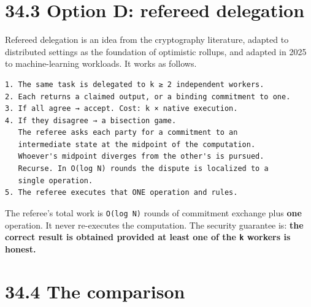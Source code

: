 \documentclass[
  11pt]{report}
\begin{document}
\hypertarget{option-d-refereed-delegation}{%
\section{34.3 Option D: refereed
delegation}\label{option-d-refereed-delegation}}

Refereed delegation is an idea from the cryptography literature, adapted
to distributed settings as the foundation of optimistic rollups, and
adapted in 2025 to machine-learning workloads. It works as follows.

\begin{verbatim}
1. The same task is delegated to k ≥ 2 independent workers.
2. Each returns a claimed output, or a binding commitment to one.
3. If all agree → accept. Cost: k × native execution.
4. If they disagree → a bisection game.
   The referee asks each party for a commitment to an
   intermediate state at the midpoint of the computation.
   Whoever's midpoint diverges from the other's is pursued.
   Recurse. In O(log N) rounds the dispute is localized to a
   single operation.
5. The referee executes that ONE operation and rules.
\end{verbatim}

The referee's total work is \texttt{O(log\ N)} rounds of commitment
exchange plus \textbf{one} operation. It never re-executes the
computation. The security guarantee is: \textbf{the correct result is
obtained provided at least one of the \texttt{k} workers is honest.}

\hypertarget{the-comparison}{%
\section{34.4 The comparison}\label{the-comparison}}
\end{document}
